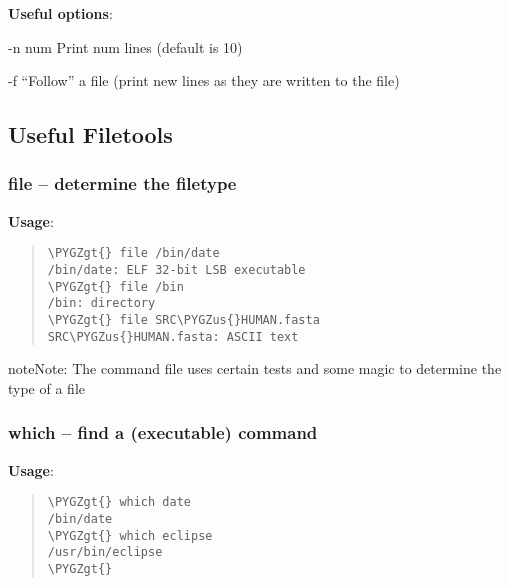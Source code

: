 \documentclass[a4paper,11pt,english]{sphinxmanual}
\def\PYGZus{\char`\_}
\def\PYGZgt{\char`\>}
\begin{document}
\textbf{Useful options}:
\begin{optionlist}{3cm}
\item [-n num]  
Print num lines (default is 10)
\item [-f]  
``Follow'' a file (print new lines as they are written to the file)
\end{optionlist}


\subsection{Useful Filetools}
\label{introduction:useful-filetools}

\subsubsection{file – determine the filetype}
\label{introduction:file-determine-the-filetype}
\textbf{Usage}:  
\begin{quote}

\begin{Verbatim}[frame=single, rulecolor=\color{lightgray}, fontfamily=courier, commandchars=\\\{\}]
\PYGZgt{} file /bin/date
/bin/date: ELF 32-bit LSB executable
\PYGZgt{} file /bin
/bin: directory
\PYGZgt{} file SRC\PYGZus{}HUMAN.fasta
SRC\PYGZus{}HUMAN.fasta: ASCII text
\end{Verbatim}
\end{quote}

\begin{notice}{note}{Note:}
The command file uses certain tests and some magic to determine the type of a file
\end{notice}


\subsubsection{which – find a (executable) command}
\label{introduction:which-find-a-executable-command}
\textbf{Usage}:  
\begin{quote}

\begin{Verbatim}[frame=single, rulecolor=\color{lightgray}, fontfamily=courier, commandchars=\\\{\}]
\PYGZgt{} which date
/bin/date
\PYGZgt{} which eclipse
/usr/bin/eclipse
\PYGZgt{}
\end{Verbatim}
\end{quote}
\end{document}
